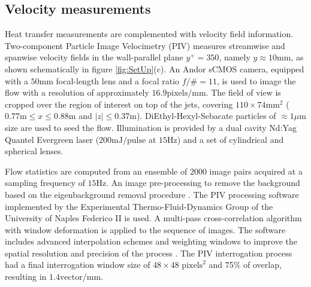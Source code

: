 \subsection{Velocity measurements \label{ss:PIV}}
Heat transfer measurements are complemented with velocity field information. Two-component Particle Image Velocimetry (PIV) measures streamwise and spanwise velocity fields in the wall-parallel plane $y^+=350$, namely $y\approx 10\mathrm{mm}$, as shown schematically in figure \ref{fig:SetUp}(c). An Andor sCMOS camera, equipped with a $50 \mathrm{mm}$ focal-length lens and a focal ratio $f/\# = 11$, is used to image the flow with a resolution of approximately $16.9 \mathrm{pixels/mm}$. The field of view is cropped over the region of interest on top of the jets, covering $110\times74\mathrm{mm}^2$ ($0.77\mathrm{m}\leq x \leq 0.88\mathrm{m}$ and $|z|\leq 0.37\mathrm{m}$). DiEthyl-Hexyl-Sebacate particles of $\approx 1 \mu\mathrm{m}$ size are used to seed the flow. Illumination is provided by a dual cavity Nd:Yag Quantel Evergreen laser ($200\mathrm{mJ/pulse}$ at $15\mathrm{Hz}$) and a set of cylindrical and spherical lenses.

Flow statistics are computed from an ensemble of $2000$ image pairs acquired at a sampling frequency of $15\mathrm{Hz}$. An image pre-processing to remove the background based on the eigenbackground removal procedure \citep{Mendez2017pod-piv}. The PIV processing software implemented by the Experimental Thermo-Fluid-Dynamics Group of the University of Naples Federico II is used. A multi-pass cross-correlation algorithm \citep{soria1996piv} with window deformation \citep{scarano2001iterativeimgdef} is applied to the sequence of images. The software includes advanced interpolation schemes and weighting windows to improve the spatial resolution and precision of the process \citep{Astarita2006PIV,Astarita2007PIV}. The PIV interrogation process had a final interrogation window size of $48\times48$ $\mathrm{pixels}^2$ and 75\% of overlap, resulting in $1.4\mathrm{vector/mm}$.

